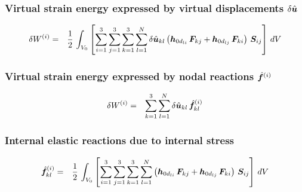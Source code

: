 \subsubsection{Virtual strain energy expressed by virtual displacements $\delta{\hat{\bm{u}}}$}
\begin{eqnarray}
\delta W^{(i)} & = & \frac{1}{2} \, \int_{V_0} \left[ \sum_{i=1}^3 \sum_{j=1}^3 \sum_{k=1}^3 \sum_{l=1}^N \delta \hat{\bm{u}}_{kl}\left(\bm{h}_{0d_{li}} \, \bm{F}_{kj} + \bm{h}_{0d_{lj}} \, \bm{F}_{ki}\right) \, \bm{S}_{ij} \right] \, dV
\end{eqnarray}

\subsubsection{Virtual strain energy expressed by nodal reactions $\hat{\bm{f}}^{(i)}$}
\begin{eqnarray}
\delta W^{(i)} & = & \sum_{k=1}^{3} \sum_{l=1}^N \delta \hat{\bm{u}}_{kl} \, \hat{\bm{f}}_{kl}^{(i)}
\end{eqnarray}

\subsubsection{Internal elastic reactions due to internal stress}
\begin{eqnarray}
\hat{\bm{f}}_{kl}^{(i)} & = & \frac{1}{2} \, \int_{V_0} \left[ \sum_{i=1}^3 \sum_{j=1}^3 \sum_{k=1}^3 \sum_{l=1}^N \left(\bm{h}_{0d_{li}} \, \bm{F}_{kj} + \bm{h}_{0d_{lj}} \, \bm{F}_{ki}\right) \, \bm{S}_{ij} \right] \, dV
\end{eqnarray}
